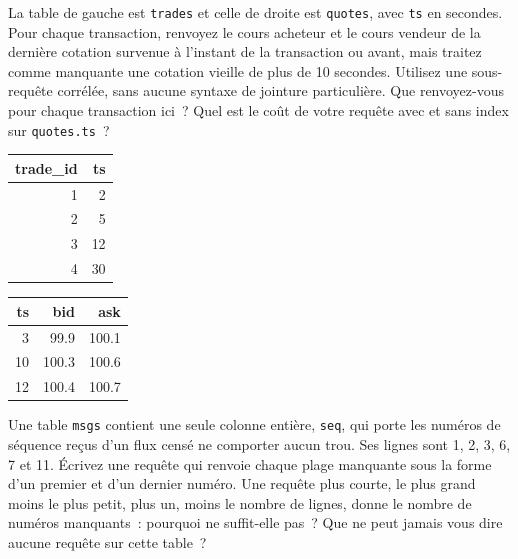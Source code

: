 \begin{question}\label{iq:iv3:sql-and-data:13}
La table de gauche est \texttt{trades} et celle de droite est \texttt{quotes}, avec \texttt{ts} en secondes. Pour chaque transaction, renvoyez le cours acheteur et le cours vendeur de la dernière cotation survenue à l'instant de la transaction ou avant, mais traitez comme manquante une cotation vieille de plus de 10 secondes. Utilisez une sous-requête corrélée, sans aucune syntaxe de jointure particulière. Que renvoyez-vous pour chaque transaction ici~? Quel est le coût de votre requête avec et sans index sur \texttt{quotes.ts}~?
\begin{center}\small
\begin{tabular}{rr}
trade\_id & ts\\\hline
1 & 2\\
2 & 5\\
3 & 12\\
4 & 30
\end{tabular}\qquad
\begin{tabular}{rrr}
ts & bid & ask\\\hline
3 & 99.9 & 100.1\\
10 & 100.3 & 100.6\\
12 & 100.4 & 100.7
\end{tabular}
\end{center}
\end{question}

\begin{question}\label{iq:iv3:sql-and-data:14}
Une table \texttt{msgs} contient une seule colonne entière, \texttt{seq}, qui porte les numéros de séquence reçus d'un flux censé ne comporter aucun trou. Ses lignes sont 1, 2, 3, 6, 7 et 11. Écrivez une requête qui renvoie chaque plage manquante sous la forme d'un premier et d'un dernier numéro. Une requête plus courte, le plus grand moins le plus petit, plus un, moins le nombre de lignes, donne le nombre de numéros manquants~: pourquoi ne suffit-elle pas~? Que ne peut jamais vous dire aucune requête sur cette table~?
\end{question}

